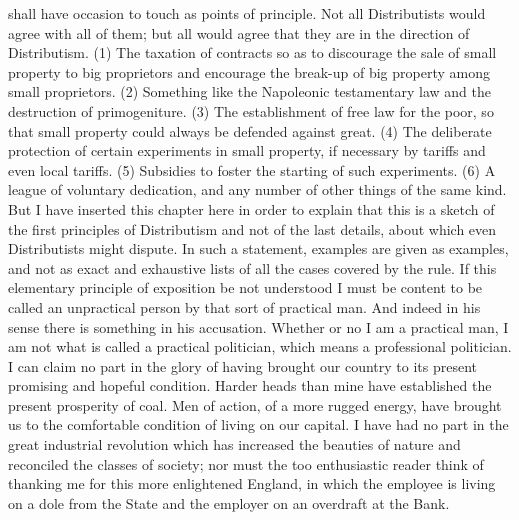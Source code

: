 \documentclass{book}
\begin{document}
shall have occasion to touch as points of principle. Not all Distributists would agree with all of them; but all would agree that they are in the direction of Distributism. (1) The taxation of contracts so as to discourage the sale of small property to big proprietors and encourage the break-up of big property among small proprietors. (2) Something like the Napoleonic testamentary law and the destruction of primogeniture. (3) The establishment of free law for the poor, so that small property could always be defended against great. (4) The deliberate protection of certain experiments in small property, if necessary by tariffs and even local tariffs. (5) Subsidies to foster the starting of such experiments. (6) A league of voluntary dedication, and any number of other things of the same kind. But I have inserted this chapter here in order to explain that this is a sketch of the first principles of Distributism and not of the last details, about which even Distributists might dispute. In such a statement, examples are given as examples, and not as exact and exhaustive lists of all the cases covered by the rule. If this elementary principle of exposition be not understood I must be content to be called an unpractical person by that sort of practical man. And indeed in his sense there is something in his accusation. Whether or no I am a practical man, I am not what is called a practical politician, which means a professional politician. I can claim no part in the glory of having brought our country to its present promising and hopeful condition. Harder heads than mine have established the present prosperity of coal. Men of action, of a more rugged energy, have brought us to the comfortable condition of living on our capital. I have had no part in the great industrial revolution which has increased the beauties of nature and reconciled the classes of society; nor must the too enthusiastic reader think of thanking me for this more enlightened England, in which the employee is living on a dole from the State and the employer on an overdraft at the Bank.
\end{document}
